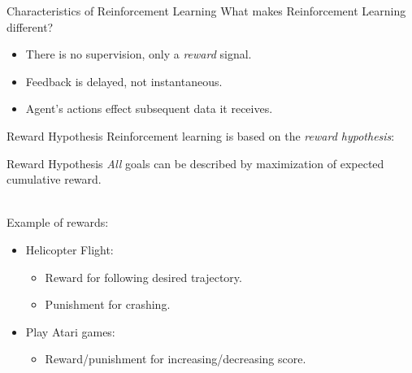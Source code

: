 \documentclass{beamer}
\begin{document}
\begin{frame}{Characteristics of Reinforcement Learning}
    What makes Reinforcement Learning different?
    \begin{itemize}
        \item There is no supervision, only a \emph{reward} signal.
        \item Feedback is delayed, not instantaneous.
        \item Agent's actions effect subsequent data it receives.
    \end{itemize}
\end{frame}

\begin{frame}{Reward Hypothesis}
    Reinforcement learning is based on the \emph{reward hypothesis}:
    \begin{alertblock}{Reward Hypothesis}
        \emph{All} goals can be described by maximization of expected cumulative reward.
    \end{alertblock}
    ~\\
    Example of rewards:
    \begin{itemize}
        \item Helicopter Flight:
        \begin{itemize}
            \item Reward for following desired trajectory.
            \item Punishment for crashing.
        \end{itemize}
        
        \item Play Atari games:
        \begin{itemize}
            \item Reward/punishment for increasing/decreasing score.
        \end{itemize}
    \end{itemize}
\end{frame}
\end{document}
